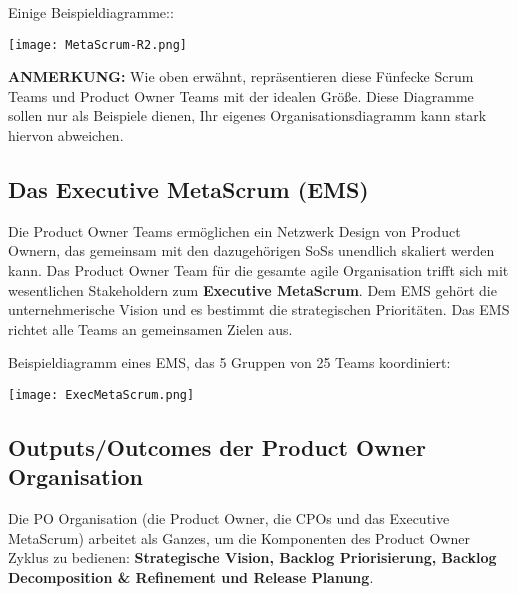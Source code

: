 \documentclass[12pt,a4paper,parskip=full]{scrartcl}
\begin{document}
Einige Beispieldiagramme::

\texttt{[image: MetaScrum-R2.png]}

\textbf{ANMERKUNG:} Wie oben erwähnt, repräsentieren diese Fünfecke Scrum Teams
und Product Owner Teams mit der idealen Größe. Diese Diagramme sollen nur als
Beispiele dienen, Ihr eigenes Organisationsdiagramm kann stark hiervon abweichen.


\subsection{Das Executive MetaScrum (EMS)}
Die Product Owner Teams ermöglichen ein Netzwerk Design von Product Ownern, das
gemeinsam mit den dazugehörigen SoSs unendlich skaliert werden kann. Das
Product Owner Team für die gesamte agile Organisation trifft sich mit
wesentlichen Stakeholdern zum \textbf{Executive MetaScrum}. Dem EMS gehört
die unternehmerische Vision und es bestimmt die strategischen Prioritäten.
Das EMS richtet alle Teams an gemeinsamen Zielen aus.

Beispieldiagramm eines EMS, das 5 Gruppen von 25 Teams koordiniert:

\texttt{[image: ExecMetaScrum.png]}

\subsection{Outputs/Outcomes der Product Owner Organisation}
Die PO Organisation (die Product Owner, die CPOs und das Executive MetaScrum)
arbeitet als Ganzes, um die Komponenten des Product Owner Zyklus zu bedienen:
\textbf{Strategische Vision, Backlog Priorisierung, Backlog Decomposition \& Refinement und Release Planung}.
\end{document}
